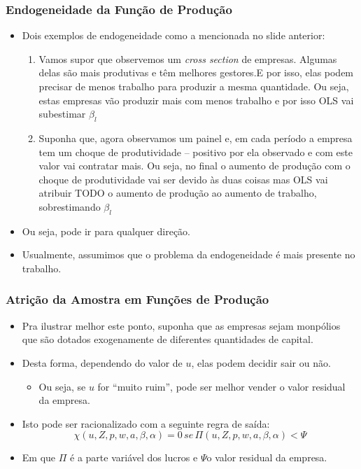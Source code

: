 \documentclass{beamer}
\begin{document}
\begin{frame}\frametitle{Endogeneidade da Função de Produção}

\scriptsize
\begin{itemize}
\item Dois exemplos de endogeneidade como a mencionada no slide anterior:

\begin{enumerate}
\item Vamos supor que observemos um \emph{cross section }de empresas. Algumas
delas são mais produtivas e têm melhores gestores.E por isso, elas
podem precisar de menos trabalho para produzir a mesma quantidade.
Ou seja, estas empresas vão produzir mais com menos trabalho e por
isso OLS vai subestimar $\beta_{l}$
\item Suponha que, agora observamos um painel e, em cada período a empresa
tem um choque de produtividade -- positivo por ela observado
e com este valor vai contratar mais. Ou seja, no final o aumento de
produção com o choque de produtividade vai ser devido às duas coisas
mas OLS vai atribuir TODO o aumento de produção ao aumento de trabalho,
sobrestimando $\beta_{l}$
\end{enumerate}
\item Ou seja, pode ir para qualquer direção. 
\item Usualmente, assumimos que o problema da endogeneidade é mais presente
no trabalho.
\end{itemize}
\end{frame}

\begin{frame}\frametitle{Atrição da Amostra em Funções de Produção}

\begin{itemize}
\item Pra ilustrar melhor este ponto, suponha que as empresas sejam monpólios
que são dotados exogenamente de diferentes quantidades de capital.
\item Desta forma, dependendo do valor de $u$, elas podem decidir sair
ou não. 

\begin{itemize}
\item Ou seja, se $u$ for ``muito ruim'', pode ser melhor vender o valor
residual da empresa.
\end{itemize}
\item Isto pode ser racionalizado com a seguinte regra de saída:
\[
\chi(u,Z,p,w,a,\beta,\alpha)=0\,se\,\Pi(u,Z,p,w,a,\beta,\alpha)<\Psi
\]
\item Em que $\Pi$ é a parte variável dos lucros e $\Psi$o valor residual
da empresa.
\end{itemize}
\end{frame}
\end{document}
